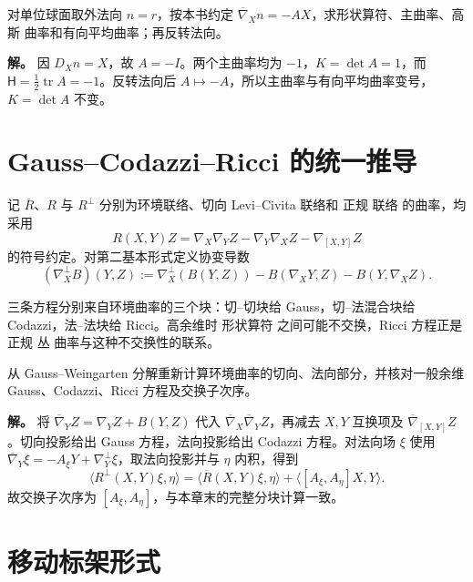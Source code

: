 \begin{workedexample}
对单位球面取外法向 \(n=r\)，按本书约定 \(\overline\nabla_Xn=-AX\)，求形状算符、主曲率、高斯 曲率和有向平均曲率；再反转法向。

\textbf{解。} 因 \(D_Xn=X\)，故 \(A=-I\)。两个主曲率均为 \(-1\)，\(K=\det A=1\)，而 \(\mathsf H=\tfrac12\operatorname{tr}A=-1\)。反转法向后 \(A\mapsto-A\)，所以主曲率与有向平均曲率变号，\(K=\det A\) 不变。
\end{workedexample}

\section{Gauss--Codazzi--Ricci 的统一推导}

记 $\overline R$、$R$ 与 $R^\perp$ 分别为环境联络、切向 Levi--Civita 联络和 正规 联络 的曲率，均采用
\[
R(X,Y)Z
=\nabla_X\nabla_YZ-\nabla_Y\nabla_XZ-\nabla_{[X,Y]}Z
\]
的符号约定。对第二基本形式定义协变导数
\begin{equation*}(\nabla_X^\perp B)(Y,Z)
:=\nabla_X^\perp(B(Y,Z))
-B(\nabla_XY,Z)-B(Y,\nabla_XZ).
\end{equation*}

三条方程分别来自环境曲率的三个块：切--切块给 Gauss，切--法混合块给 Codazzi，法--法块给 Ricci。高余维时 形状算符 之间可能不交换，Ricci 方程正是 正规 丛 曲率与这种不交换性的联系。

\begin{workedexample}
从 Gauss--Weingarten 分解重新计算环境曲率的切向、法向部分，并核对一般余维 Gauss、Codazzi、Ricci 方程及交换子次序。

\textbf{解。} 将 \(\overline\nabla_YZ=\nabla_YZ+B(Y,Z)\) 代入 \(\overline\nabla_X\overline\nabla_YZ\)，再减去 \(X,Y\) 互换项及 \(\overline\nabla_{[X,Y]}Z\)。切向投影给出 Gauss 方程，法向投影给出 Codazzi 方程。对法向场 \(\xi\) 使用 \(\overline\nabla_Y\xi=-A_\xi Y+\nabla_Y^\perp\xi\)，取法向投影并与 \(\eta\) 内积，得到
\[
\langle R^\perp(X,Y)\xi,\eta\rangle
=\langle\overline R(X,Y)\xi,\eta\rangle+\langle[A_\xi,A_\eta]X,Y\rangle.
\]
故交换子次序为 \([A_\xi,A_\eta]\)，与本章末的完整分块计算一致。
\end{workedexample}


\section{移动标架形式}

